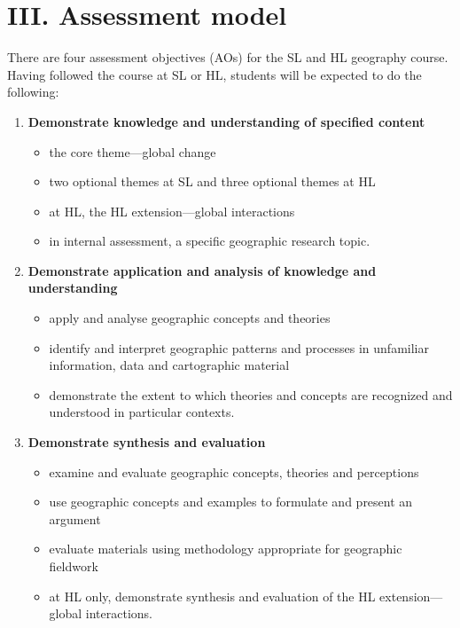 \documentclass[11pt,a4paper]{article}
\begin{document}
\section*{III. Assessment model}

There are four assessment objectives (AOs) for the SL and HL geography course.
Having followed the course at SL or HL, students will be expected to do the
following:

\begin{enumerate}
    \item \textbf{Demonstrate knowledge and understanding of specified content}
    \begin{itemize}
        \item the core theme---global change
        \item two optional themes at SL and three optional themes at HL
        \item at HL, the HL extension---global interactions
        \item in internal assessment, a specific geographic research topic.
    \end{itemize}
    \item \textbf{Demonstrate application and analysis of knowledge and understanding}
    \begin{itemize}
        \item apply and analyse geographic concepts and theories
        \item identify and interpret geographic patterns and processes in
        unfamiliar information, data and cartographic material
        \item demonstrate the extent to which theories and concepts are recognized
        and understood in particular contexts.
    \end{itemize}
    \item \textbf{Demonstrate synthesis and evaluation}
    \begin{itemize}
        \item examine and evaluate geographic concepts, theories and perceptions
        \item use geographic concepts and examples to formulate and present
        an argument
        \item evaluate materials using methodology appropriate for geographic
        fieldwork
        \item at HL only, demonstrate synthesis and evaluation of the HL
        extension---global interactions.
    \end{itemize}

\end{enumerate}
\end{document}
